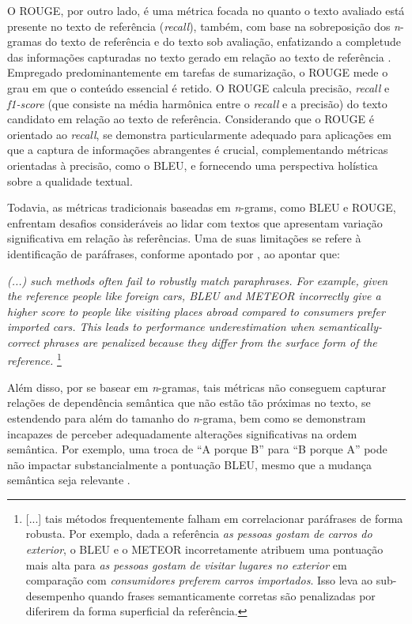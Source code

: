 O ROUGE, por outro lado, é uma métrica focada no quanto o texto avaliado está presente no texto de referência (\textit{recall}), também, com base na sobreposição dos \textit{n}-gramas do texto de referência e do texto sob avaliação, enfatizando a completude das informações capturadas no texto gerado em relação ao texto de referência \cite{ROUGE:1}. Empregado predominantemente em tarefas de sumarização, o ROUGE mede o grau em que o conteúdo essencial é retido. O ROUGE calcula precisão, \textit{recall} e \textit{f1-score} (que consiste na média harmônica entre o \textit{recall} e a precisão) do texto candidato em relação ao texto de referência. Considerando que o ROUGE é orientado ao \textit{recall}, se demonstra particularmente adequado para aplicações em que a captura de informações abrangentes é crucial, complementando métricas orientadas à precisão, como o BLEU, e fornecendo uma perspectiva holística sobre a qualidade textual.

Todavia, as métricas tradicionais baseadas em \textit{n}-grams, como BLEU e ROUGE, enfrentam desafios consideráveis ao lidar com textos que apresentam variação significativa em relação às referências. Uma de suas limitações se refere à identificação de paráfrases, conforme apontado por , ao apontar que:

\begin{citacao}
    \textit{(...) such methods often fail to robustly match paraphrases. For example, given the reference \textit{people like foreign cars}, BLEU and METEOR incorrectly give a higher score to \textit{people like visiting places abroad} compared to \textit{consumers prefer imported cars}. This leads to performance underestimation when semantically-correct phrases are penalized because they differ from the surface form of the reference.}
    \footnote{[...] tais métodos frequentemente falham em correlacionar paráfrases de forma robusta. Por exemplo, dada a referência \textit{as pessoas gostam de carros do exterior}, o BLEU e o METEOR incorretamente atribuem uma pontuação mais alta para \textit{as pessoas gostam de visitar lugares no exterior} em comparação com \textit{consumidores preferem carros importados}. Isso leva ao sub-desempenho quando frases semanticamente corretas são penalizadas por diferirem da forma superficial da referência.}
\end{citacao}

Além disso, por se basear em \textit{n}-gramas, tais métricas não conseguem capturar relações de dependência semântica que não estão tão próximas no texto, se estendendo para além do tamanho do \textit{n}-grama, bem como se demonstram incapazes de perceber adequadamente alterações significativas na ordem semântica. Por exemplo, uma troca de ``A porque B'' para ``B porque A'' pode não impactar substancialmente a pontuação BLEU, mesmo que a mudança semântica seja relevante \cite{BERTScore:2}. 

